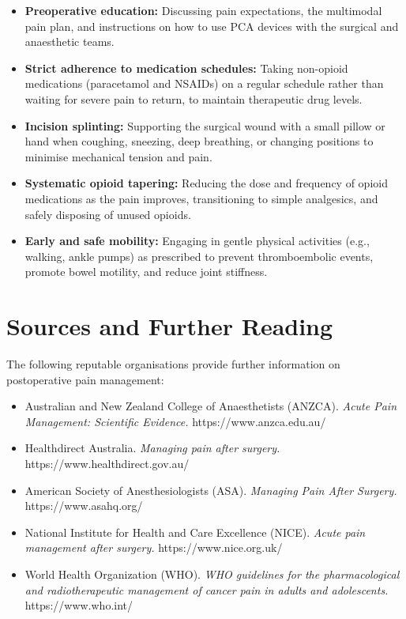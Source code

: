 \begin{itemize}
    \item \textbf{Preoperative education:} Discussing pain expectations, the multimodal pain plan, and instructions on how to use PCA devices with the surgical and anaesthetic teams.
    \item \textbf{Strict adherence to medication schedules:} Taking non-opioid medications (paracetamol and NSAIDs) on a regular schedule rather than waiting for severe pain to return, to maintain therapeutic drug levels.
    \item \textbf{Incision splinting:} Supporting the surgical wound with a small pillow or hand when coughing, sneezing, deep breathing, or changing positions to minimise mechanical tension and pain.
    \item \textbf{Systematic opioid tapering:} Reducing the dose and frequency of opioid medications as the pain improves, transitioning to simple analgesics, and safely disposing of unused opioids.
    \item \textbf{Early and safe mobility:} Engaging in gentle physical activities (e.g., walking, ankle pumps) as prescribed to prevent thromboembolic events, promote bowel motility, and reduce joint stiffness.
\end{itemize}

\section*{Sources and Further Reading}
The following reputable organisations provide further information on postoperative pain management:

\begin{itemize}
    \item Australian and New Zealand College of Anaesthetists (ANZCA). \textit{Acute Pain Management: Scientific Evidence.} https://www.anzca.edu.au/
    \item Healthdirect Australia. \textit{Managing pain after surgery.} https://www.healthdirect.gov.au/
    \item American Society of Anesthesiologists (ASA). \textit{Managing Pain After Surgery.} https://www.asahq.org/
    \item National Institute for Health and Care Excellence (NICE). \textit{Acute pain management after surgery.} https://www.nice.org.uk/
    \item World Health Organization (WHO). \textit{WHO guidelines for the pharmacological and radiotherapeutic management of cancer pain in adults and adolescents.} https://www.who.int/
\end{itemize}

